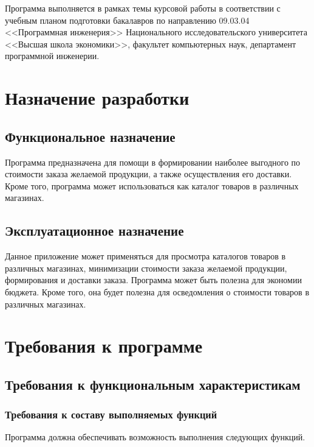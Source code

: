 \documentclass[a4paper,12pt,reqno]{article}
\begin{document}
  Программа выполняется в рамках темы курсовой работы в соответствии с учебным планом подготовки бакалавров по направлению 09.03.04 <<Программная инженерия>> Национального исследовательского университета <<Высшая школа экономики>>, факультет компьютерных наук, департамент программной инженерии.

  \newpage
  \section{Назначение разработки}
  \subsection{Функциональное назначение}
  Программа предназначена для помощи в формировании наиболее выгодного по стоимости заказа желаемой продукции,
  а также осуществления его доставки.
  Кроме того, программа может использоваться как каталог товаров в различных магазинах.

  \subsection{Эксплуатационное назначение}
  Данное приложение может применяться для просмотра каталогов товаров в различных магазинах,
  минимизации стоимости заказа желаемой продукции, формирования и доставки заказа.
  Программа может быть полезна для экономии бюджета.
  Кроме того, она будет полезна для осведомления о стоимости товаров в различных магазинах.

  \newpage
  \section{Требования к программе}
  \subsection{Требования к функциональным характеристикам}
  \subsubsection{Требования к составу выполняемых функций}
  \label{sec:funcs}
  Программа должна обеспечивать возможность выполнения следующих функций.
\end{document}
